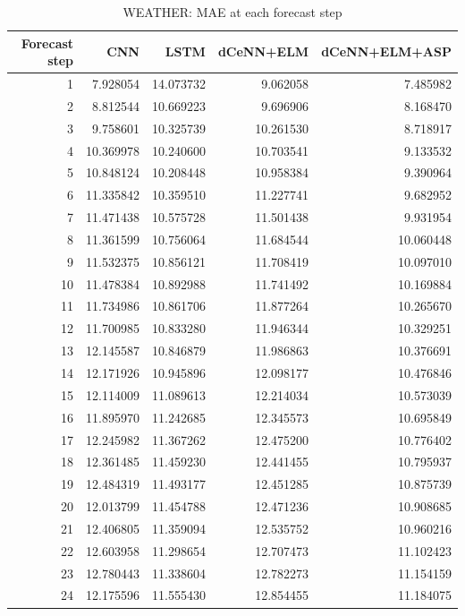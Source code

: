 \begin{table}
\caption{WEATHER: MAE at each forecast step}
\begin{tabular}{rrrrr}
\toprule
Forecast step & CNN & LSTM & dCeNN+ELM & dCeNN+ELM+ASP \\
\midrule
1 & 7.928054 & 14.073732 & 9.062058 & 7.485982 \\
2 & 8.812544 & 10.669223 & 9.696906 & 8.168470 \\
3 & 9.758601 & 10.325739 & 10.261530 & 8.718917 \\
4 & 10.369978 & 10.240600 & 10.703541 & 9.133532 \\
5 & 10.848124 & 10.208448 & 10.958384 & 9.390964 \\
6 & 11.335842 & 10.359510 & 11.227741 & 9.682952 \\
7 & 11.471438 & 10.575728 & 11.501438 & 9.931954 \\
8 & 11.361599 & 10.756064 & 11.684544 & 10.060448 \\
9 & 11.532375 & 10.856121 & 11.708419 & 10.097010 \\
10 & 11.478384 & 10.892988 & 11.741492 & 10.169884 \\
11 & 11.734986 & 10.861706 & 11.877264 & 10.265670 \\
12 & 11.700985 & 10.833280 & 11.946344 & 10.329251 \\
13 & 12.145587 & 10.846879 & 11.986863 & 10.376691 \\
14 & 12.171926 & 10.945896 & 12.098177 & 10.476846 \\
15 & 12.114009 & 11.089613 & 12.214034 & 10.573039 \\
16 & 11.895970 & 11.242685 & 12.345573 & 10.695849 \\
17 & 12.245982 & 11.367262 & 12.475200 & 10.776402 \\
18 & 12.361485 & 11.459230 & 12.441455 & 10.795937 \\
19 & 12.484319 & 11.493177 & 12.451285 & 10.875739 \\
20 & 12.013799 & 11.454788 & 12.471236 & 10.908685 \\
21 & 12.406805 & 11.359094 & 12.535752 & 10.960216 \\
22 & 12.603958 & 11.298654 & 12.707473 & 11.102423 \\
23 & 12.780443 & 11.338604 & 12.782273 & 11.154159 \\
24 & 12.175596 & 11.555430 & 12.854455 & 11.184075 \\
\bottomrule
\end{tabular}
\end{table}
